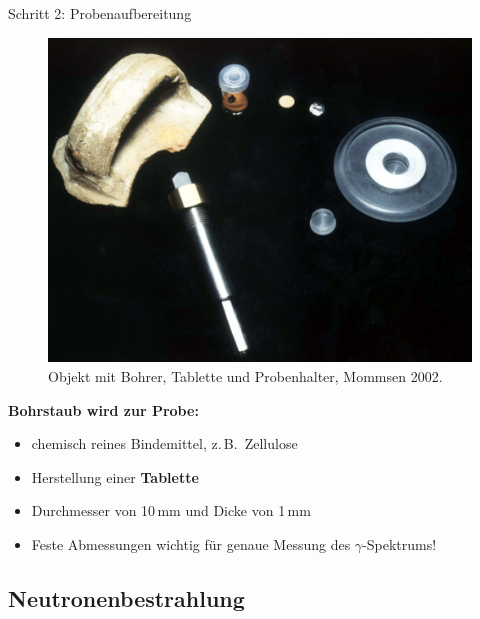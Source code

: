 \documentclass[xcolor=dvipsnames, aspectratio=169]{beamer}
\begin{document}
\begin{frame}{Schritt 2: Probenaufbereitung}
\begin{minipage}{0.5\textwidth}
\begin{figure}
\includegraphics[width=\textwidth]{img/pill.jpg}
\caption{Objekt mit Bohrer, Tablette und Probenhalter, Mommsen 2002.}
\end{figure}
\end{minipage}\hfill
\begin{minipage}{.44\textwidth}\flushleft
\textbf{Bohrstaub wird zur Probe:}\smallskip

\begin{itemize}
\item chemisch reines Bindemittel, z.\,B.\ Zellulose
\item Herstellung einer \textbf{Tablette}
\item Durchmesser von 10\,mm und Dicke von 1\,mm
\item Feste Abmessungen wichtig für genaue Messung des $\gamma$-Spektrums!
\end{itemize}
\end{minipage}
\end{frame}

\subsection{Neutronenbestrahlung}
\end{document}
